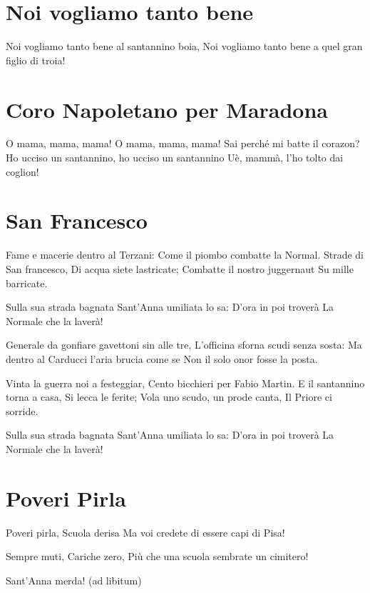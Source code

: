 \section{Noi vogliamo tanto bene}
\subtitle{Sulla base di “Noi vogliamo tanto bene alla Polizia Italiana”}
\begin{canzone}
Noi vogliamo tanto bene al santannino boia,
Noi vogliamo tanto bene a quel gran figlio di troia!
\end{canzone}

\section{Coro Napoletano per Maradona}
\begin{canzone}
O mama, mama, mama! O mama, mama, mama!
Sai perché mi batte il corazon? 
Ho ucciso un santannino, ho ucciso un santannino
Uè, mammà, l'ho tolto dai coglion!
\end{canzone}

\section{San Francesco}
\subtitle{Sulla melodia di “Stalingrado” degli Stormy Six}
\begin{canzone}
Fame e macerie dentro al Terzani:
Come il piombo combatte la Normal.
Strade di San francesco, 
Di acqua siete lastricate;
Combatte il nostro juggernaut 
Su mille barricate.

Sulla sua strada bagnata
Sant’Anna umiliata lo sa:
D’ora in poi troverà
La Normale che la laverà!

Generale da gonfiare gavettoni sin alle tre,
L’officina sforna scudi senza sosta:
Ma dentro al Carducci l’aria brucia come se
Non il solo onor fosse la posta.

Vinta la guerra noi a festeggiar,
Cento bicchieri per Fabio Martin.
E il santannino torna a casa,
Si lecca le ferite;
Vola uno scudo, un prode canta,
Il Priore ci sorride.

Sulla sua strada bagnata
Sant’Anna umiliata lo sa:
D’ora in poi troverà
La Normale che la laverà!
\end{canzone}

\section{Poveri Pirla}
\begin{canzone}
Poveri pirla,
Scuola derisa
Ma voi credete di essere capi di Pisa!

Sempre muti,
Cariche zero,
Più che una scuola sembrate un cimitero!

Sant'Anna merda! (ad libitum)
\end{canzone}

